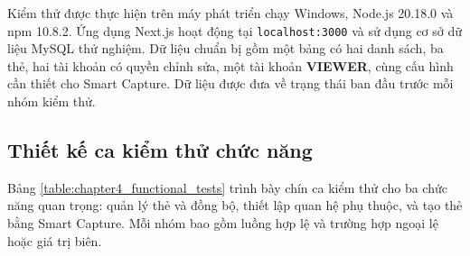 \documentclass[../DoAn.tex]{subfiles}
\begin{document}
Kiểm thử được thực hiện trên máy phát triển chạy Windows, Node.js 20.18.0 và npm 10.8.2. Ứng dụng Next.js hoạt động tại \texttt{localhost:3000} và sử dụng cơ sở dữ liệu MySQL thử nghiệm. Dữ liệu chuẩn bị gồm một bảng có hai danh sách, ba thẻ, hai tài khoản có quyền chỉnh sửa, một tài khoản \textbf{VIEWER}, cùng cấu hình cần thiết cho Smart Capture. Dữ liệu được đưa về trạng thái ban đầu trước mỗi nhóm kiểm thử.

\subsection{Thiết kế ca kiểm thử chức năng}
\label{subsection:4.4.2}

Bảng \ref{table:chapter4_functional_tests} trình bày chín ca kiểm thử cho ba chức năng quan trọng: quản lý thẻ và đồng bộ, thiết lập quan hệ phụ thuộc, và tạo thẻ bằng Smart Capture. Mỗi nhóm bao gồm luồng hợp lệ và trường hợp ngoại lệ hoặc giá trị biên.
\end{document}
